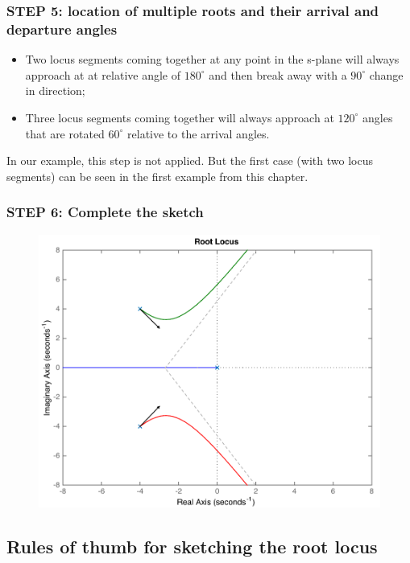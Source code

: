 \begin{frame}
\frametitle{STEP 5: location of multiple roots and their arrival and departure angles}
	\begin{itemize}
	\item Two locus segments coming together at any point in the s-plane will always approach at at relative angle of $180^{\circ}$ and then break away with a $90^{\circ}$ change in direction; 
	\item Three locus segments coming together will always approach at $120^{\circ}$ angles that are rotated $60^{\circ}$ relative to the arrival angles.
	\end{itemize}
	\begin{exampleblock}{}
		In our example, this step is not applied. But the first case (with two locus segments) can be seen in the first example from this chapter. 
	\end{exampleblock}
\end{frame}

\begin{frame}
\frametitle{STEP 6: Complete the sketch}
	\begin{exampleblock}{}	
		\begin{figure}
			\centering
			\includegraphics[width=0.7\linewidth]{how_to_draw_ex6}
		\end{figure}
	\end{exampleblock}
\end{frame}

\subsection{Rules of thumb for sketching the root locus}

